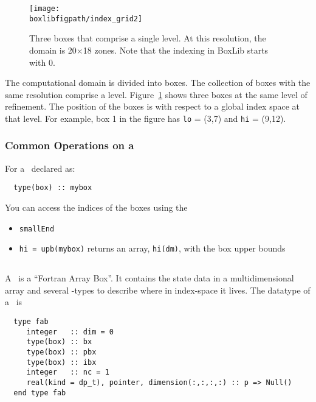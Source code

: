 \begin{figure}[h]
\centering
\texttt{[image: \\boxlibfigpath/index\_grid2]}
\caption[Single-level grid structure]
{\label{fig:boxes} Three boxes that comprise a single level.  At this
  resolution, the domain is 20$\times$18 zones.  Note that the
  indexing in BoxLib starts with $0$.}
\end{figure}

The computational domain is divided into boxes.  The collection of
boxes with the same resolution comprise a level.
Figure~\ref{fig:boxes} shows three boxes at the same level of
refinement.  The position of the boxes is with respect to a global
index space at that level.  For example, box 1 in the figure has 
{\tt lo} = (3,7) and {\tt hi} = (9,12).  

\subsubsection{Common Operations on a \Boxtype}

For a \Boxtype\ declared as:
\begin{verbatim}
  type(box) :: mybox
\end{verbatim}

You can access the indices of the boxes using the 

\begin{itemize}

\item {\tt smallEnd} 

\item {\tt hi = upb(mybox)} returns an array, {\tt hi(dm)}, with
     the box upper bounds

\end{itemize}

\subsection{\FAB}

A \FAB\ is a ``Fortran Array Box''.  It contains the state data in a
multidimensional array and several \Boxtype-types to describe where in
index-space it lives.  The datatype of a \FAB\ is
\begin{verbatim}
  type fab
     integer   :: dim = 0
     type(box) :: bx
     type(box) :: pbx
     type(box) :: ibx
     integer   :: nc = 1
     real(kind = dp_t), pointer, dimension(:,:,:,:) :: p => Null()
  end type fab
\end{verbatim}
 
